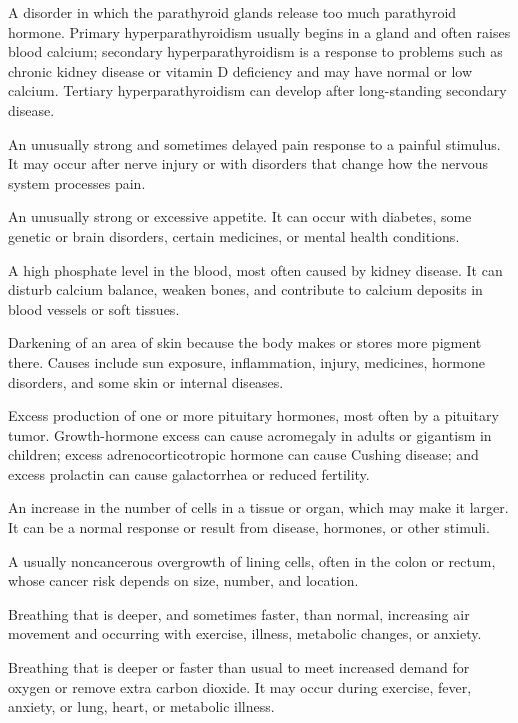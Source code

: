  A disorder in which the parathyroid glands release too much parathyroid hormone. Primary hyperparathyroidism usually begins in a gland and often raises blood calcium; secondary hyperparathyroidism is a response to problems such as chronic kidney disease or vitamin D deficiency and may have normal or low calcium. Tertiary hyperparathyroidism can develop after long-standing secondary disease.

 An unusually strong and sometimes delayed pain response to a painful stimulus. It may occur after nerve injury or with disorders that change how the nervous system processes pain.

 An unusually strong or excessive appetite. It can occur with diabetes, some genetic or brain disorders, certain medicines, or mental health conditions.

 A high phosphate level in the blood, most often caused by kidney disease. It can disturb calcium balance, weaken bones, and contribute to calcium deposits in blood vessels or soft tissues.

 Darkening of an area of skin because the body makes or stores more pigment there. Causes include sun exposure, inflammation, injury, medicines, hormone disorders, and some skin or internal diseases.

 Excess production of one or more pituitary hormones, most often by a pituitary tumor. Growth-hormone excess can cause acromegaly in adults or gigantism in children; excess adrenocorticotropic hormone can cause Cushing disease; and excess prolactin can cause galactorrhea or reduced fertility.

 An increase in the number of cells in a tissue or organ, which may make it larger. It can be a normal response or result from disease, hormones, or other stimuli.

 A usually noncancerous overgrowth of lining cells, often in the colon or rectum, whose cancer risk depends on size, number, and location.

 Breathing that is deeper, and sometimes faster, than normal, increasing air movement and occurring with exercise, illness, metabolic changes, or anxiety.

 Breathing that is deeper or faster than usual to meet increased demand for oxygen or remove extra carbon dioxide. It may occur during exercise, fever, anxiety, or lung, heart, or metabolic illness.

